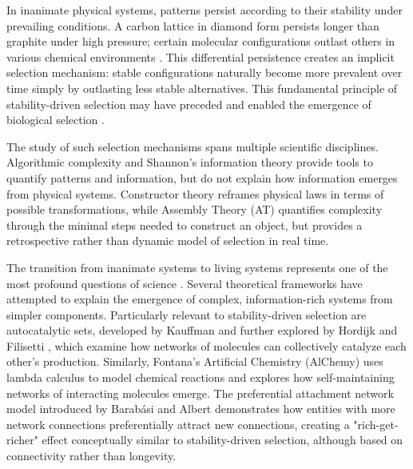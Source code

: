\documentclass[preprint,12pt]{elsarticle}
\begin{document}
In inanimate physical systems, patterns persist according to their stability under prevailing conditions. A carbon lattice in diamond form persists longer than graphite under high pressure; certain molecular configurations outlast others in various chemical environments \cite{davies2006goldilocks}. This differential persistence creates an implicit selection mechanism: stable configurations naturally become more prevalent over time simply by outlasting less stable alternatives. This fundamental principle of stability-driven selection may have preceded and enabled the emergence of biological selection \cite{hordijk2012autocatalytic, nghe2015prebiotic}.

The study of such selection mechanisms spans multiple scientific disciplines. Algorithmic complexity \cite{kolmogorov1965complexity, chaitin1977algorithmic, solomonoff1964formal} and Shannon's information theory \cite{shannon1948mathematical} provide tools to quantify patterns and information, but do not explain how information emerges from physical systems. Constructor theory \cite{deutsch2013constructor} reframes physical laws in terms of possible transformations, while Assembly Theory (AT) \cite{walker2023nature} quantifies complexity through the minimal steps needed to construct an object, but provides a retrospective rather than dynamic model of selection in real time.

The transition from inanimate systems to living systems represents one of the most profound questions of science \cite{schrodinger1944life, pross2016life}. Several theoretical frameworks have attempted to explain the emergence of complex, information-rich systems from simpler components. Particularly relevant to stability-driven selection are autocatalytic sets, developed by Kauffman \cite{kauffman1986autocatalytic} and further explored by Hordijk and Filisetti \cite{hordijk2011required}, which examine how networks of molecules can collectively catalyze each other's production. Similarly, Fontana's Artificial Chemistry (AlChemy) \cite{fontana1991algorithmic} uses lambda calculus to model chemical reactions and explores how self-maintaining networks of interacting molecules emerge. The preferential attachment network model introduced by Barabási and Albert \cite{barabasi1999emergence} demonstrates how entities with more network connections preferentially attract new connections, creating a "rich-get-richer" effect conceptually similar to stability-driven selection, although based on connectivity rather than longevity.
\end{document}
